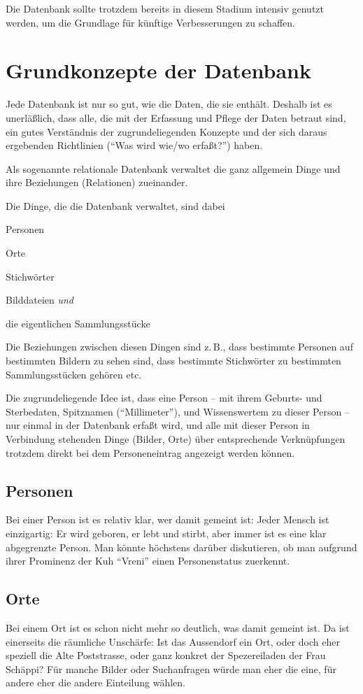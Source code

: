 \documentclass[12pt]{scrreprt}
\begin{document}
Die Datenbank sollte trotzdem bereits in diesem Stadium intensiv
genutzt werden, um die Grundlage für künftige Verbesserungen zu
schaffen.

\chapter{Grundkonzepte der Datenbank}

Jede Datenbank ist nur so gut, wie die Daten, die sie enthält.
Deshalb ist es unerläßlich, dass alle, die mit der Erfassung und
Pflege der Daten betraut sind, ein gutes Verständnis der
zugrundeliegenden Konzepte und der sich daraus ergebenden Richtlinien
(``Was wird wie/wo erfaßt?'')  haben.

Als sogenannte relationale Datenbank verwaltet die \DB{} ganz allgemein Dinge und
ihre Beziehungen (Relationen) zueinander.

Die Dinge, die die Datenbank verwaltet, sind dabei
\begin{citemize}
\item Personen
\item Orte
\item Stichwörter
\item Bilddateien \textit{und}
\item die eigentlichen Sammlungsstücke
\end{citemize}

Die Beziehungen zwischen diesen Dingen sind z.\,B., dass bestimmte
Personen auf bestimmten Bildern zu sehen sind, dass bestimmte Stichwörter
zu bestimmten Sammlungsstücken gehören etc.

Die zugrundeliegende Idee ist, dass eine Person -- mit ihrem Geburts- und Sterbedaten,
Spitznamen (``Millimeter''), und Wissenswertem zu dieser Person -- nur
einmal in der Datenbank erfaßt wird, und alle mit dieser Person in Verbindung
stehenden Dinge (Bilder, Orte) über entsprechende Verknüpfungen trotzdem direkt
bei dem Personeneintrag angezeigt werden können.

\section{Personen} Bei einer Person ist es relativ klar, wer damit gemeint ist:
Jeder Mensch ist einzigartig: Er wird geboren, er lebt und stirbt, aber immer ist
es eine klar abgegrenzte Person. Man könnte höchstens darüber diskutieren, ob man aufgrund ihrer
Prominenz der Kuh ``Vreni'' einen Personenstatus zuerkennt.

\section{Orte} Bei einem Ort ist es schon nicht mehr so deutlich, was damit gemeint ist.
Da ist einerseits die räumliche Unschärfe: Ist das Aussendorf ein Ort, oder doch
eher speziell die Alte Poststrasse, oder ganz konkret der Spezereiladen der Frau Schäppi?
Für manche Bilder oder Suchanfragen würde man eher die eine, für andere eher die andere
Einteilung wählen. 
\end{document}
